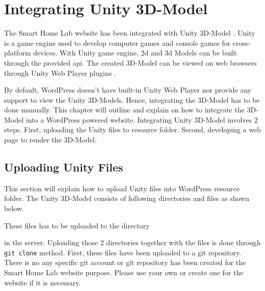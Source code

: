 \chapter{Integrating Unity 3D-Model} \label{sec:unity-integrating-unity-3d-model}

The Smart Home Lab website has been integrated with Unity 3D-Model \cite{DeanTakahashi.2014}. Unity is a game engine used to develop computer games and console games for cross-platform devices. With Unity game engine, \ac{2d} and \ac{3d} Models can be built through the provided \ac{api}. The created 3D-Model can be viewed on web browsers through Unity Web Player plugins \cite{Unity3D.2017}.

By default, WordPress doesn't have built-in Unity Web Player nor provide any support to view the Unity 3D-Models. Hence, integrating the 3D-Model has to be done manually. This chapter will outline and explain on how to integrate the 3D-Model into a WordPress powered website. Integrating Unity 3D-Model involves 2 steps. First, uploading the Unity files to resource folder. Second, developing a web page to render the 3D-Model.

\section{Uploading Unity Files} \label{sec:unity-uploading-unity-files}
This section will explain how to upload Unity files into WordPress resource folder. The Unity 3D-Model consists of following directories and files as shown below. 
\newline


\bigskip

These files has to be uploaded to the directory \begin{quote}\end{quote} in the server. Uploading those 2 directories together with the files is done through \texttt{git clone} method. First, these files have been uploaded to a git repository. There is no any specific git account or git repository has been created for the Smart Home Lab website purpose. Please use your own or create one for the website if it is necessary.


